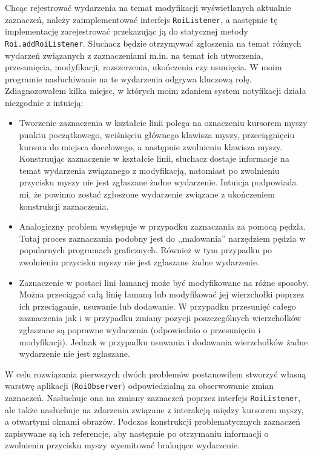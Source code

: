 \documentclass[declaration,shortabstract,mgr]{iithesis}
\begin{document}
Chcąc rejestrować wydarzenia na temat modyfikacji wyświetlanych aktualnie zaznaczeń, należy zaimplementować interfejs \texttt{RoiListener}, a następnie tę implementację zarejestrować przekazując ją do statycznej metody \texttt{Roi.addRoiListener}.
Słuchacz będzie otrzymywać zgłoszenia na temat różnych wydarzeń związanych z zaznaczeniami m.in. na temat ich utworzenia, przesunięcia, modyfikacji, rozszerzenia, ukończenia czy usunięcia.
W moim programie nasłuchiwanie na te wydarzenia odgrywa kluczową rolę.
Zdiagnozowałem kilka miejsc, w których moim zdaniem system notyfikacji działa niezgodnie z intuicją:
\begin{itemize}
  \item Tworzenie zaznaczenia w kształcie linii polega na oznaczeniu kursorem myszy punktu początkowego, wciśnięciu głównego klawisza myszy, przeciągnięciu kursora do miejsca docelowego, a następnie zwolnieniu klawisza myszy. Konstruując zaznaczenie w kształcie linii, słuchacz dostaje informacje na temat wydarzenia związanego z modyfikacją, natomiast po zwolnieniu przycisku myszy nie jest zgłaszane żadne wydarzenie. Intuicja podpowiada mi, że powinno zostać zgłoszone wydarzenie związane z ukończeniem konstrukcji zaznaczenia.
  \item Analogiczny problem występuje w przypadku zaznaczania za pomocą pędzla. Tutaj proces zaznaczania podobny jest do ,,malowania'' narzędziem pędzla w popularnych programach graficznych. Również w tym przypadku po zwolnieniu przycisku myszy nie jest zgłaszane żadne wydarzenie.
  \item Zaznaczenie w postaci lini łamanej może być modyfikowane na różne sposoby. Można przeciągać całą linię łamaną lub modyfikować jej wierzchołki poprzez ich przeciąganie, usuwanie lub dodawanie. W przypadku przesunięć całego zaznaczenia jak i w przypadku zmiany pozycji poszczególnych wierzchołków zgłaszane są poprawne wydarzenia (odpowiednio o przesunięciu i modyfikacji). Jednak w przypadku usuwania i dodawania wierzchołków żadne wydarzenie nie jest zgłaszane.
\end{itemize}

W celu rozwiązania pierwszych dwóch problemów postanowiłem stworzyć własną warstwę aplikacji (\texttt{RoiObserver}) odpowiedzialną za obserwowanie zmian zaznaczeń.
Nasłuchuje ona na zmiany zaznaczeń poprzez interfejs \texttt{RoiListener}, ale także nasłuchuje na zdarzenia związane z interakcją między kursorem myszy, a otwartymi oknami obrazów.
Podczas konstrukcji problematycznych zaznaczeń zapisywane są ich referencje, aby następnie po otrzymaniu informacji o zwolnieniu przycisku myszy wyemitować brakujące wydarzenie.
\end{document}
